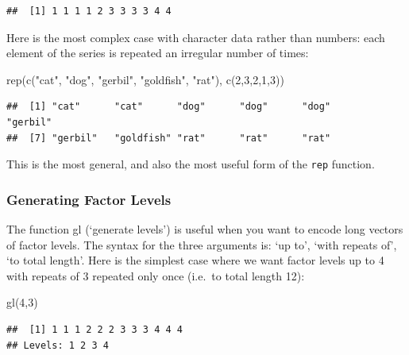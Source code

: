 \documentclass[
]{book}
\newenvironment{Shaded}{\begin{snugshade}}{\end{snugshade}}
\newcommand{\DecValTok}[1]{\textcolor[rgb]{0.00,0.00,0.81}{#1}}
\newcommand{\FunctionTok}[1]{\textcolor[rgb]{0.00,0.00,0.00}{#1}}
\newcommand{\NormalTok}[1]{#1}
\newcommand{\StringTok}[1]{\textcolor[rgb]{0.31,0.60,0.02}{#1}}
\theoremstyle{definition}
\theoremstyle{definition}
\theoremstyle{definition}
\theoremstyle{definition}
\theoremstyle{remark}
\begin{document}
\begin{verbatim}
##  [1] 1 1 1 1 2 3 3 3 3 4 4
\end{verbatim}

Here is the most complex case with character data rather than numbers: each element of the series is repeated an irregular number of times:

\begin{Shaded}
\begin{Highlighting}[]
\FunctionTok{rep}\NormalTok{(}\FunctionTok{c}\NormalTok{(}\StringTok{"cat"}\NormalTok{, }\StringTok{"dog"}\NormalTok{, }\StringTok{"gerbil"}\NormalTok{, }\StringTok{"goldfish"}\NormalTok{, }\StringTok{"rat"}\NormalTok{), }\FunctionTok{c}\NormalTok{(}\DecValTok{2}\NormalTok{,}\DecValTok{3}\NormalTok{,}\DecValTok{2}\NormalTok{,}\DecValTok{1}\NormalTok{,}\DecValTok{3}\NormalTok{))}
\end{Highlighting}
\end{Shaded}

\begin{verbatim}
##  [1] "cat"      "cat"      "dog"      "dog"      "dog"      "gerbil"  
##  [7] "gerbil"   "goldfish" "rat"      "rat"      "rat"
\end{verbatim}

This is the most general, and also the most useful form of the \texttt{rep} function.

\hypertarget{generating-factor-levels}{%
\subsubsection{Generating Factor Levels}\label{generating-factor-levels}}

The function gl (`generate levels') is useful when you want to encode long vectors of factor levels. The syntax for the three arguments is: `up to', `with repeats of', `to total length'. Here is the simplest case where we want factor levels up to 4 with repeats of 3 repeated only once (i.e.~to total length 12):

\begin{Shaded}
\begin{Highlighting}[]
\FunctionTok{gl}\NormalTok{(}\DecValTok{4}\NormalTok{,}\DecValTok{3}\NormalTok{)}
\end{Highlighting}
\end{Shaded}

\begin{verbatim}
##  [1] 1 1 1 2 2 2 3 3 3 4 4 4
## Levels: 1 2 3 4
\end{verbatim}
\end{document}
